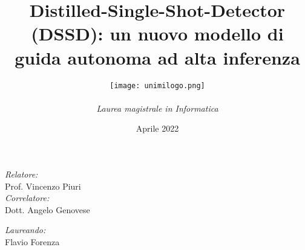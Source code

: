 \documentclass[10pt, xcolor={dvipsnames}]{beamer}
\title[]{Distilled-Single-Shot-Detector (DSSD): un nuovo modello di guida autonoma ad alta inferenza}
\author[Flavio Forenza]{
                        \texttt{[image: 
                                        unimilogo.png]}\\ 
                                        \vspace{0.1cm}
                                        \fontfamily{cmr}\selectfont {\bfseries{UNIVERSITÀ DEGLI STUDI DI MILANO}}\\
                                        \fontfamily{cmr}\selectfont \emph{Laurea magistrale in Informatica}\\
                                        \vspace{1cm}
                                        }
\date{\scriptsize Aprile 2022}
\begin{document}
\begin{frame}
    \maketitle
    \vspace{-2.5cm}
    \begin{minipage}{\linewidth}
        \centering
        \begin{minipage}{0.45\linewidth}
            \begin{flushleft}
                \emph{Relatore:}\\
                Prof. Vincenzo Piuri\\
                \emph{Correlatore:}\\
                Dott. Angelo Genovese
            \end{flushleft}
        \end{minipage}
        \begin{minipage}{0.45\linewidth}
            \begin{flushright}
                \emph{Laureando:}\\
                Flavio Forenza
            \end{flushright}
        \end{minipage}
    \end{minipage}
\end{frame}















\end{document}
